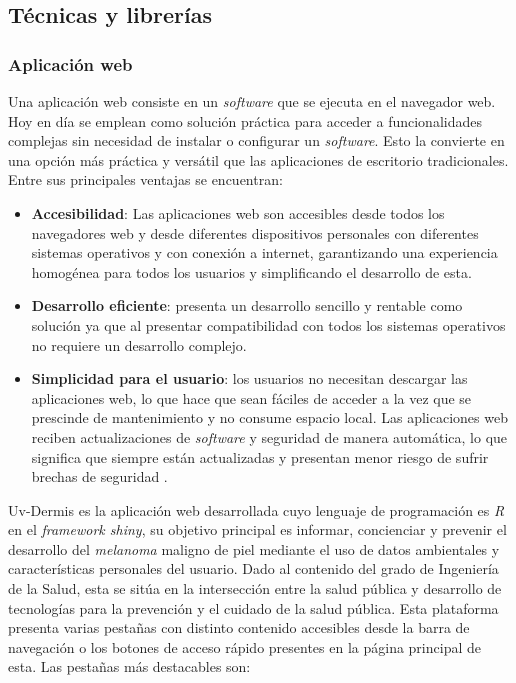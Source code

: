 \subsection{Técnicas y librerías}

 \subsubsection{Aplicación web}
 Una aplicación web consiste en un \textit{software} que se ejecuta en el navegador web. Hoy en día se emplean como solución práctica para acceder a funcionalidades complejas sin necesidad de instalar o configurar un \textit{software}. Esto la convierte en una opción más práctica y versátil que las aplicaciones de escritorio tradicionales. Entre sus principales ventajas se encuentran:
 \begin{itemize}
     \item \textbf{Accesibilidad}: Las aplicaciones web son accesibles desde todos los navegadores web y desde diferentes dispositivos personales con diferentes sistemas operativos y con conexión a internet, garantizando una experiencia homogénea para todos los usuarios y simplificando el desarrollo de esta.
     \item \textbf{Desarrollo eficiente}: presenta un desarrollo sencillo y rentable como solución ya que al presentar compatibilidad con todos los sistemas operativos no requiere un desarrollo complejo.
     \item \textbf{Simplicidad para el usuario}: los usuarios no necesitan descargar las aplicaciones web, lo que hace que sean fáciles de acceder a la vez que se prescinde de mantenimiento y no consume espacio local. Las aplicaciones web reciben actualizaciones de \textit{software} y seguridad de manera automática, lo que significa que siempre están actualizadas y presentan menor riesgo de sufrir brechas de seguridad \cite{QueEsAplicacion}.
     
 \end{itemize}
 
Uv-Dermis es la aplicación web desarrollada cuyo lenguaje de programación es \textit{R} en el \textit{framework shiny}, su objetivo principal es informar, concienciar y prevenir el desarrollo del \textit{melanoma} maligno de piel mediante el uso de datos ambientales y características personales del usuario. Dado al contenido del grado de Ingeniería de la Salud, esta se sitúa en la intersección entre la salud pública y desarrollo de tecnologías para la prevención y el cuidado de la salud pública.
Esta plataforma presenta varias pestañas con distinto contenido accesibles desde la barra de navegación o los botones de acceso rápido presentes en la página principal de esta. Las pestañas más destacables son:

